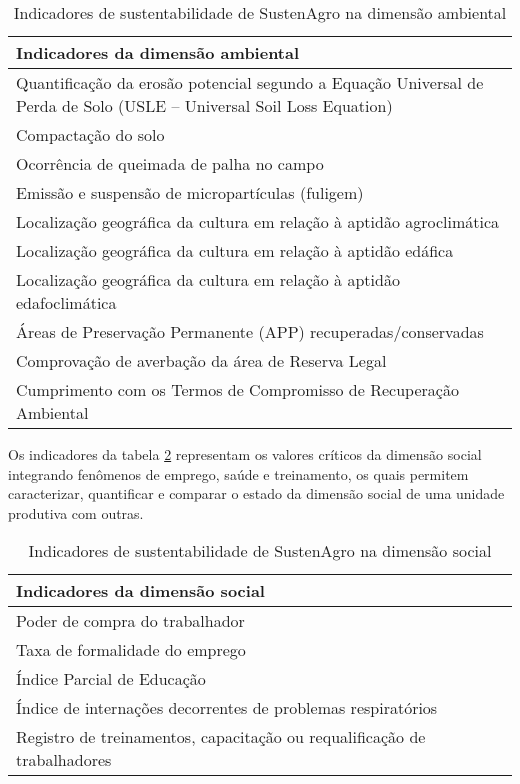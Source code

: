 \begin{table}[h]
\begin{tabular}{|>{\raggedright}p{14cm}|}
\hline 
\textbf{Indicadores da dimensão ambiental}\tabularnewline
\hline 
\hline 
Quantificação da erosão potencial segundo a Equação Universal de Perda
de Solo (USLE – \foreignlanguage{english}{Universal Soil Loss Equation})\tabularnewline
\hline 
Compactação do solo\tabularnewline
\hline 
Ocorrência de queimada de palha no campo\tabularnewline
\hline 
Emissão e suspensão de micropartículas (fuligem)\tabularnewline
\hline 
Localização geográfica da cultura em relação à aptidão agroclimática\tabularnewline
\hline 
Localização geográfica da cultura em relação à aptidão edáfica\tabularnewline
\hline 
Localização geográfica da cultura em relação à aptidão edafoclimática\tabularnewline
\hline 
Áreas de Preservação Permanente (APP) recuperadas/conservadas\tabularnewline
\hline 
Comprovação de averbação da área de Reserva Legal\tabularnewline
\hline 
Cumprimento com os Termos de Compromisso de Recuperação Ambiental\tabularnewline
\hline 
\end{tabular}\caption{Indicadores de sustentabilidade de SustenAgro na dimensão ambiental
\label{tab:Indicadores-de-sustentabilidade-ambiental}}
\end{table}

Os indicadores da tabela \ref{tab:Indicadores-de-sustentabilidade-social}
representam os valores críticos da dimensão social integrando fenômenos
de emprego, saúde e treinamento, os quais permitem caracterizar, quantificar
e comparar o estado da dimensão social de uma unidade produtiva com
outras.

\begin{table}[h]
\begin{tabular}{|>{\raggedright}p{14cm}|}
\hline 
\textbf{Indicadores da dimensão social}\tabularnewline
\hline 
\hline 
Poder de compra do trabalhador\tabularnewline
\hline 
\hline 
Taxa de formalidade do emprego\tabularnewline
\hline 
\hline 
Índice Parcial de Educação\tabularnewline
\hline 
\hline 
Índice de internações decorrentes de problemas respiratórios\tabularnewline
\hline 
\hline 
Registro de treinamentos, capacitação ou requalificação de trabalhadores\tabularnewline
\hline 
\end{tabular}

\caption{Indicadores de sustentabilidade de SustenAgro na dimensão social \label{tab:Indicadores-de-sustentabilidade-social} }
\end{table}


